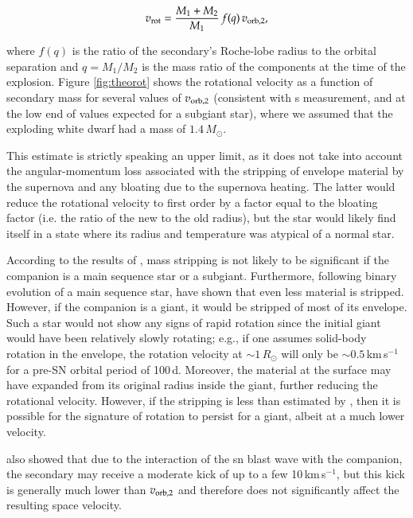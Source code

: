 $$ v_{\rm rot} = {M_1 + M_2\over M_1}\,f(q)\,v_{\rm orb, 2} ,$$

where $f(q)$ is the ratio of the secondary's Roche-lobe radius to the
orbital separation \citep[e.g., given by][]{1983ApJ...268..368E} and
$q=M_1/M_2$ is the mass ratio of the components at the time of the
explosion. Figure \ref{fig:theorot} shows the rotational velocity as a
function of secondary mass for several values of $v_{\rm orb, 2}$ (consistent with \rl s measurement, and at the low end of values expected for a subgiant star),
where we assumed that the exploding white dwarf had a mass of
$1.4\,M_\odot$.

This estimate is strictly speaking an upper limit, as it does not
take into account the angular-momentum loss associated with the
stripping of envelope material by the supernova and any bloating due
to the supernova heating. The latter would reduce the rotational
velocity to first order by a factor equal to the bloating
factor (i.e. the ratio of the new to the old radius), but the
star would likely find itself in a state where its radius and
temperature was atypical of a normal star. 

According to the results of  \citet{2000ApJS..128..615M}, mass stripping is
not likely to be significant if the companion is a main sequence star
or a subgiant. Furthermore, following binary evolution of a main sequence star, \citet{2008A&A...489..943P} have shown that even less material is stripped. However, if the companion is a giant, it would be
stripped of most of its envelope.  Such a star would not show any
signs of rapid rotation since the initial giant would have been
relatively slowly rotating; e.g., if one assumes solid-body rotation
in the envelope, the rotation velocity at $\sim 1\, R_\odot$ will only
be $\sim 0.5\,$km\,s$^{-1}$ for a pre-SN orbital period of
100\,d. Moreover, the material at the surface may have expanded from
its original radius inside the giant, further reducing the rotational
velocity. However, if the stripping is less than estimated by  \citet{2000ApJS..128..615M}, then it is possible for the signature of rotation to persist for a giant, albeit at a much lower velocity.

 \citet{2000ApJS..128..615M} also showed that due to the interaction
of the \gls{sn} blast wave with the companion, the secondary may receive
a moderate kick of up to a few 10\,km\,s$^{-1}$, but this kick
is generally much lower than $v_{\rm orb,2}$ and therefore does
not significantly affect the resulting space velocity.

